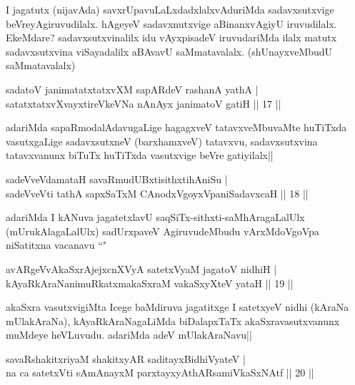 \begin{artha}
I jagatutx (nijavAda) savxrUpavuLaLxdadxlalxvAduriMda sadavxsutxvige beVreyAgiruvudilalx. hAgeyeV sadavxnutxvige aBinanxvAgiyU iruvudilalx. EkeMdare? sadavxsutxvinalilx idu vAyxpisadeV iruvudariMda ilalx matutx sadavxsutxvina viSayadalilx aBAvavU saMmatavalalx. (shUnayxveMbudU saMmatavalalx) 
\end{artha}


\begin{shl}
sadatoV janimatatxtatxvXM sapARdeV rashanA yathA |\\
satatxtatxvXvayxtireVkeVNa nAnAyx janimatoV gatiH \hfill || 17 ||
\end{shl}

\begin{artha}%
adariMda sapaRmodalAdavugaLige hagagxveV tatavxveMbuvaMte huTiTxda vasutxgaLige sadavxsutxneV (barxhamxveV) tatavxvu, sadavxsutxvina tatavxvanunx biTuTx huTiTxda vasutxvige beVre gatiyilalx||
\end{artha}


\begin{shl}
sadeVveVdamataH savaRmudUBxtisithxtihAniSu |\\
sadeVveVti tathA sapxSaTxM CAnodxVgoyxVpaniSadavxcaH \hfill || 18 ||
\end{shl}

\begin{artha}
adariMda I kANuva jagatetxlavU saqSiTx-sithxti-saMhAragaLalUlx (mUrukAlagaLalUlx) sadUrxpaveV AgiruvudeMbudu vArxMdoVgoVpa niSatitxna vacanavu ``\stext " 
\end{artha}

\begin{shl}
avARgeVvAkaSxrAjejxcnXVyA satetxVyaM jagatoV nidhiH |\\
kAyaRkAraNanimuRkatxmakaSxraM vakaSxyXteV yataH \hfill || 19 ||
\end{shl}

\begin{artha}
akaSxra vasutxvigiMta Icege baMdiruva jagatitxge I satetxyeV nidhi (kAraNa mUlakAraNa), kAyaRkAraNagaLiMda biDalapxTaTx akaSxravasutxvanunx muMdeye heVLuvudu. adariMda adeV mUlakAraNavu||
\end{artha}

\begin{shl}
savaRshakitxriyaM shakitxyAR saditayxBidhiVyateV |\\
na ca satetxVti sAmAnayxM parxtayxyAthARsamiVkaSxNAtf \hfill || 20 ||
\end{shl}


